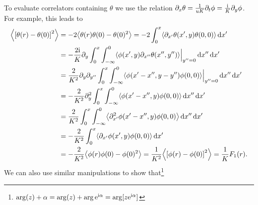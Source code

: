 \documentclass[english, parskip=full]{scrartcl}
\begin{document}
To evaluate correlators containing $\theta$ we use the relation $\partial_x\theta = \frac{1}{uK} \partial_t\phi = \frac{\text{i}}{K} \partial_y\phi$.
For example, this leads to
\begin{align}
\bra*{\klb*{\theta(r) - \theta(0)}^2} &= -2\bra*{\theta(r)\theta(0) - \theta(0)^2} = -2\intx{0}{x}{\bra*{\partial_{x'}\theta(x',y) \theta(0,0)}}{x'}\\
&= -\frac{2\i}{K} \partial_y \intx{0}{x}{\intx{-\infty}{0}{\bra*{\phi(x',y) \partial_{x''}\theta(x'',y'')} \Big\vert_{y''=0}}{x''}}{x'}\\
&= \frac{2}{K^2} \partial_y\partial_{y''} \intx{0}{x}{\intx{-\infty}{0}{\bra*{\phi(x'-x'',y-y'')\phi(0,0)} \Big\vert_{y''=0}}{x''}}{x'}\\
&= -\frac{2}{K^2} \partial_y^2 \intx{0}{x}{\intx{-\infty}{0}{\bra*{\phi(x'-x'', y)\phi(0,0)}}{x''}}{x'}\\
&= \frac{2}{K^2} \intx{0}{x}{\intx{-\infty}{0}{\bra*{\partial_{x'}^2 \phi(x'-x'', y)\phi(0,0)}}{x''}}{x'}\\
&= -\frac{2}{K^2} \intx{0}{x}{\bra*{\partial_{x'} \phi(x', y)\phi(0,0)}}{x'}\\
&= -\frac{2}{K^2} \bra*{\phi(r)\phi(0) - \phi(0)^2} = \frac{1}{K^2} \bra*{\klb*{\phi(r) - \phi(0)}^2} = \frac{1}{K}F_1(r).
\end{align}
We can also use similar manipulations to show that\footnote{$\arg(z) + \alpha = \arg(z) + \arg \powe{\i \alpha} = \arg \klb*{z \powe{\i \alpha}}$}
\end{document}
